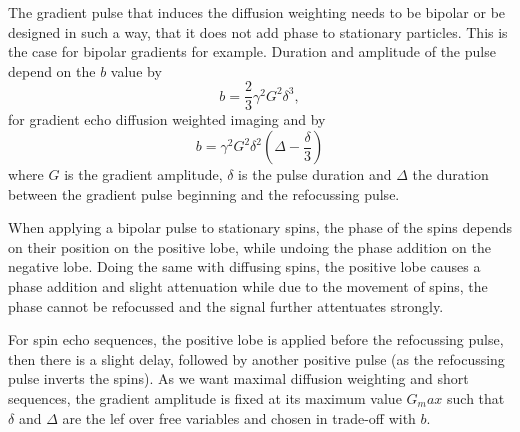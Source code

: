The gradient pulse that induces the diffusion weighting needs to be bipolar or be designed in such a way, that it does not add phase to stationary particles.
This is the case for bipolar gradients for example.
Duration and amplitude of the pulse depend on the $b$ value by
\[ b = \frac{2}{3} \gamma^2 G^2 \delta^3, \] for gradient echo diffusion weighted imaging and by
\[ b = \gamma^2 G^2 \delta^2 (\Delta - \frac{\delta}{3}) \]
where $G$ is the gradient amplitude, $\delta$ is the pulse duration and $\Delta$ the duration between the gradient pulse beginning and the refocussing pulse.

When applying a bipolar pulse to stationary spins, the phase of the spins depends on their position on the positive lobe, while undoing the phase addition on the negative lobe.
Doing the same with diffusing spins, the positive lobe causes a phase addition and slight attenuation while due to the movement of spins, the phase cannot be refocussed and the signal further attentuates strongly.

For spin echo sequences, the positive lobe is applied before the refocussing pulse, then there is a slight delay, followed by another positive pulse (as the refocussing pulse inverts the spins).
As we want maximal diffusion weighting and short sequences, the gradient amplitude is fixed at its maximum value $G_max$ such that $\delta$ and $\Delta$ are the lef over free variables and chosen in trade-off with $b$.

